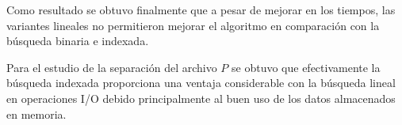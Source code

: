 \documentclass[11pt]{article}
\begin{document}
Como resultado se obtuvo finalmente que a pesar de mejorar en los tiempos, las variantes lineales no permitieron mejorar el algoritmo en comparación con la búsqueda binaria e indexada.

Para el estudio de la separación del archivo $P$ se obtuvo que efectivamente la búsqueda indexada proporciona una ventaja considerable con la búsqueda lineal en operaciones I/O debido principalmente al buen uso de los datos almacenados en memoria.
\end{document}
